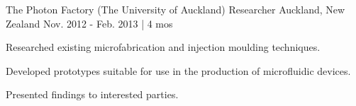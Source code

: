 \begin{cventries}

\cventry
{The Photon Factory (The University of Auckland)} %
{Researcher} %
{Auckland, New Zealand} %
{Nov. 2012 - Feb. 2013 | 4 mos} %
{ %
\begin{cvitems}
\item {Researched existing microfabrication and injection moulding techniques.}
\item {Developed prototypes suitable for use in the production of microfluidic devices.}
\item {Presented findings to interested parties.}
\end{cvitems}
}


\end{cventries}
